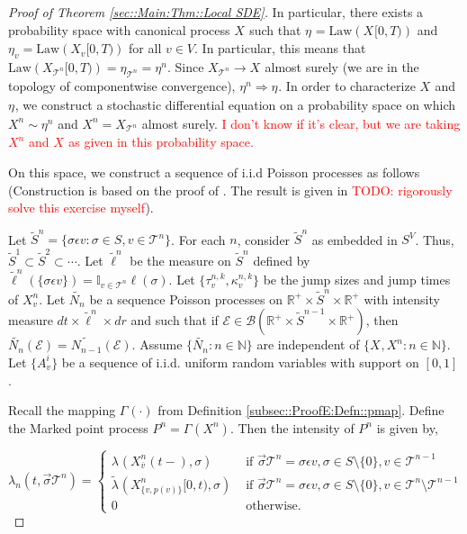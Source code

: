 \documentclass[12pt]{article}
\newcommand{\mb}{\mathbb}
\newcommand{\mc}{\mathcal}
\newcommand{\ms}{\mathscr}
\newcommand{\ra}{\rightarrow}
\newcommand{\ov}{\overline}
\newcommand{\te}{\text}
\newcommand{\ep}{\epsilon}
\newcommand{\tr}{\textcolor{red}}
\newcommand{\ind}{\hspace{24pt}}
\renewcommand{\v}{v}							%
\renewcommand{\S}{S}							%
\newcommand{\s}{\sigma}							%
\newcommand{\sv}{\vec{\s}}						%
\newcommand{\ev}{\ep}							%
\newcommand{\T}{T}								%
\renewcommand{\t}{t}							%
\newcommand{\cl}{\ov}							%
\newcommand{\poiss}[1]{N_{#1}}						%
\newcommand{\law}{\te{Law}}							%
\newcommand{\pup}[1]{^{#1}}							%
\newcommand{\tree}{\mc{T}}							%
\newcommand{\V}{V}									%
\renewcommand{\r}{r}								%
\newcommand{\rt}[1]{\tau^{#1}}						%
\renewcommand{\it}{k}								%
\newcommand{\itt}{i}								%
\newcommand{\numb}{n}								%
\newcommand{\XState}[1]{\S^{#1}}				%
\newcommand{\rxvtn}[3]{X_{#1}^{#3}(#2)}				%
\newcommand{\rxvts}[2]{X_{#1}{#2}}					%
\newcommand{\rxvtsn}[3]{X_{#1}^{#3}{#2}}			%
\newcommand{\rp}[1]{P^{#1}}							%
\newcommand{\mmm}[3]{\eta_{#2#1}^{#3}}						%
\newcommand{\rate}[1]{\lambda_{#1}}					%
\newcommand{\crate}[2]{\alt{\lambda}_{#1}^{#2}}		%
\newcommand{\Sm}{\ell}								%
\newcommand{\alt}{\widetilde}						%
\newcommand{\rv}{A}								%
\newcommand{\evnt}{\mc{E}}						%
\renewcommand{\mark}[1]{\kappa^{#1}}				%
\newcommand{\p}[1]{p(#1)}						%
\newcommand{\pmap}[1]{\Gamma_{#1}}				%
\begin{document}
\begin{proof}[Proof of Theorem \ref{sec::Main:Thm::Local SDE}]
\ind In particular, there exists a probability space with canonical process \(\rxvts{}{}\) such that \(\mmm{}{}{} = \law(\rxvts{}{[0,\T)})\) and \(\mmm{\v}{}{} = \law(\rxvts{\v}{[0,\T)})\) for all \(\v \in \V\). In particular, this means that \(\law(\rxvts{\tree\pup{\numb}}{[0,\T)}) = \mmm{\tree\pup{\numb}}{}{} = \mmm{}{}{\numb}\). Since \(\rxvts{\tree\pup{\numb}}{} \ra \rxvts{}{}\) almost surely (we are in the topology of componentwise convergence), \(\mmm{}{}{\numb} \Rightarrow \mmm{}{}{}\). In order to characterize \(\rxvts{}{}\) and \(\mmm{}{}{}\), we construct a stochastic differential equation on a probability space on which \(\rxvtsn{}{}{\numb} \sim \mmm{}{}{\numb}\) and \(\rxvtsn{}{}{\numb} = \rxvts{\tree\pup{\numb}}{}\) almost surely. \tr{I don't know if it's clear, but we are taking \(\rxvtsn{}{}{\numb}\) and \(\rxvts{}{}\) as given in this probability space.}

\ind On this space, we construct a sequence of i.i.d Poisson processes as follows (Construction is based on the proof of \cite[Theorem 14.7.1(b)]{DalVer08}. The result is given in \cite[Exercise 14.7.1]{DalVer08} \tr{TODO: rigorously solve this exercise myself}).

\ind Let \(\alt{\S}^\numb = \{\s\ev{\v}: \s\in\S,\v \in \tree\pup{\numb}\}\). For each \(\numb\), consider \(\alt{\S}^\numb\) as embedded in \(\S^\V\). Thus, \(\alt{\S}^1 \subset \alt{\S}^2 \subset \cdots\). Let \(\alt{\Sm}\pup{\numb}\) be the measure on \(\alt{\S}^\numb\) defined by \(\alt{\Sm}\pup{\numb}(\{\s\ev{\v}\}) = \mb{I}_{\v \in \tree\pup{\numb}}\Sm(\s)\). Let \(\{\rt{\numb,\it}_\v,\mark{\numb,\it}_{\v}\}\) be the jump sizes and jump times of \(\rxvtsn{\v}{}{\numb}\). Let \(\alt{\poiss{\numb}}\) be a sequence Poisson processes on \(\mb{R}^+\times\alt{S}^\numb\times \mb{R}^+\) with intensity measure \(d\t\times\alt{\Sm}^\numb\times d\r\) and such that if \(\evnt \in \ms{B}(\mb{R}^+\times\alt{S}^{\numb-1}\times \mb{R}^+)\), then \(\alt{\poiss{\numb}}(\evnt) = \alt{\poiss{\numb-1}}(\evnt)\). Assume \(\{\alt{\poiss{\numb}}:\numb\in\mb{N}\}\) are independent of \(\{\rxvts{}{},\rxvtsn{}{}{\numb}:\numb\in\mb{N}\}\). Let \(\{\rv_{\v}^{\itt}\}\) be a sequence of i.i.d. uniform random variables with support on \([0,1]\).

\ind Recall the mapping \(\pmap{}(\cdot)\) from Definition \ref{subsec::ProofE:Defn::pmap}. Define the Marked point process \(\rp{\numb} = \pmap{}(\rxvtsn{}{}{\numb})\). Then the intensity of \(\rp{\numb}\) is given by,

\[\rate{\numb}(\t,\sv{\tree\pup{\numb}}) = \begin{cases}
\rate{}(\rxvtn{\cl{\v}}{\t-}{\numb},\s) &\te{ if } \sv{\tree\pup{\numb}} = \s\ev{\v},\s \in \S\setminus\{0\},\v\in\tree\pup{\numb-1}\\
\crate{}{}(\rxvtsn{\{\v,\p{\v}\}}{[0,\t)}{\numb},\s) &\te{ if } \sv{\tree\pup{\numb}} = \s\ev{\v},\s\in\S\setminus\{0\},\v\in\tree\pup{\numb}\setminus\tree\pup{\numb-1}\\
0 &\te{ otherwise.}
\end{cases}\]


\end{proof}
\end{document}
